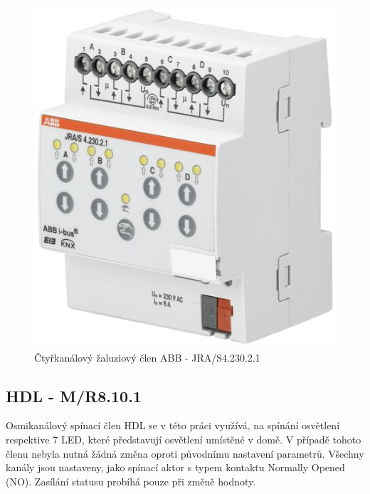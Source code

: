 \begin{figure}[!ht]
  \begin{center}
    \includegraphics[scale=0.25]{obrazky/ABB aktor2.jpg}
  \end{center}
  \caption[Čtyřkanálový žaluziový člen ABB - JRA/S4.230.2.1 \cite{ABB aktor2}]{Čtyřkanálový žaluziový člen ABB - JRA/S4.230.2.1  \cite{ABB aktor2}}
  \label{fig:Čtyřkanálový žaluziový člen ABB - JRA/S4.230.2.1}
\end{figure}

\subsection{HDL - M/R8.10.1}
Osmikanálový spínací člen HDL se v této práci využívá, na spínání osvětlení respektive 7 LED, které představují osvětlení umístěné v domě. V případě tohoto členu nebyla nutná žádná změna oproti původnímu nastavení parametrů. Všechny kanály jsou nastaveny, jako spínací aktor s typem kontaktu Normally Opened (NO). Zasílání statusu probíhá pouze při změně hodnoty.

